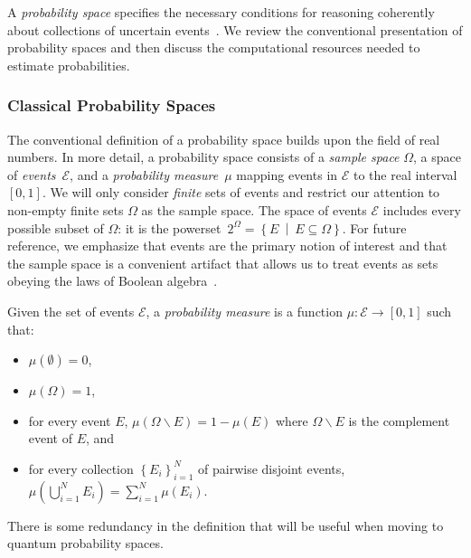 \documentclass{article}
\theoremstyle{remark}
\newcommand{\events}{\ensuremath{\mathcal{E}}}
\newcommand{\pmeas}{\ensuremath{\mu}}
\begin{document}
A \emph{probability space} specifies the necessary conditions for
reasoning coherently about collections of uncertain events~\cite{Kolmogorov1950,Shafer1976,Griffiths2003,Swart2013}.
We review the conventional presentation of probability spaces and
then discuss the computational resources needed to estimate probabilities.



\subsubsection{Classical Probability Spaces}

The conventional definition of a probability space builds upon the
field of real numbers. In more detail, a probability space consists
of a \emph{sample space} $\Omega$, a space of \emph{events}~$\events$,
and a \emph{probability measure}~$\pmeas$ mapping events in $\events$
to the real interval $[0,1]$. We will only consider \emph{finite}
sets of events and restrict our attention to non-empty finite sets
$\Omega$ as the sample space. The space of events $\events$ includes
every possible subset of $\Omega$: it is the powerset~$2^{\Omega}=\left\{ E~\middle|~E\subseteq\Omega\right\} $.
For future reference, we emphasize that events are the primary notion
of interest and that the sample space is a convenient artifact that
allows us to treat events as sets obeying the laws of Boolean algebra~\cite{Boole1948,Redhead1987-REDINA,Griffiths2003}.

\begin{definition}\label{def:ClassicalProbabilitySpace}
Given the set of events $\events$, a \emph{probability measure} is
a function $\pmeas:\events\rightarrow[0,1]$ such that: 
\begin{itemize}
\item $\pmeas(\emptyset)=0$, 
\item $\pmeas(\Omega)=1$, 
\item for every event $E$, $\pmeas\left(\Omega\backslash E\right)=1-\pmeas\left(E\right)$
where $\Omega\backslash E$ is the complement event of $E$, and 
\item for every collection $\left\{ E_{i}\right\} _{i=1}^{N}$ of pairwise
disjoint events, $\pmeas\left(\bigcup_{i=1}^{N}E_{i}\right)=\sum_{i=1}^{N}\pmeas(E_{i})$. 
\end{itemize}
\end{definition} There is some redundancy in the definition that
will be useful when moving to quantum probability spaces.
\end{document}
